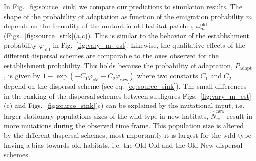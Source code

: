 \documentclass[a4paper,11pt]{article}
\newcommand{\chg}[1]{\textcolor{change}{#1}}
\begin{document}
In Fig.~\ref{fig:source_sink} we compare our predictions to simulation results. The shape of the probability of adaptation as function of the emigration probability $m$ depends on the fecundity of the mutant in old-habitat patches, $\omega^\text{old}_m$ (Figs.~\ref{fig:source_sink}(a,c)). This is similar to the behavior of the establishment probability $\varphi_{\text{old}}$ in Fig.~\ref{fig:vary_m_est}. Likewise, the qualitative effects of the different dispersal schemes are comparable to the ones observed for the establishment probability. \chg{This holds because the probability of adaptation, $P_{\text{adapt}}$, is given by $1-\exp(-C_1 \varphi_{\text{old}} -C_2 \varphi_{\text{new}})$ where two constants $C_1$ and $C_2$ depend on the dispersal scheme (see eq.~\eqref{eq:source_sink}). \linelabel{R2-35}The small differences in the ranking of the dispersal schemes between subfigures Figs.~\ref{fig:vary_m_est}(c) and Figs.~\ref{fig:source_sink}(c) can be explained by the mutational input, i.e. larger stationary populations sizes of the wild type in new habitats, $\widehat{N}_w^{\text{new}}$ result in more mutations during the observed time frame. This population size is altered by the different dispersal schemes, most importantly it is largest for the wild type having a bias towards old habitats, i.e. the Old-Old and the Old-New dispersal schemes.} 
\end{document}
